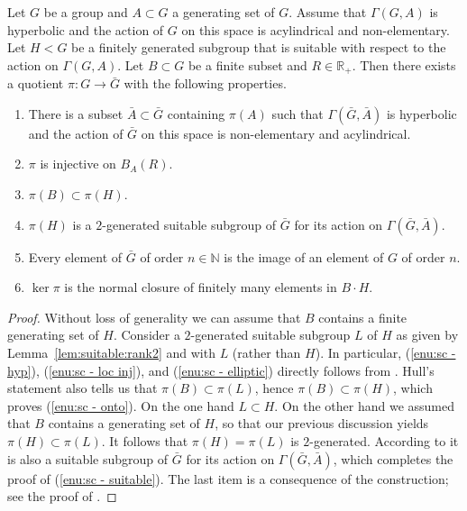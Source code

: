 \begin{theorem}
\label{thm:sc}
Let $G$ be a group and $A \subset G$ a generating set of $G$.
Assume that $\Gamma(G,A)$ is hyperbolic and the action of $G$ on this space is acylindrical and non-elementary.
Let $H < G$ be a finitely generated subgroup that is suitable with respect to the action on $\Gamma(G,A)$. Let $B \subset G$ be a finite subset and $R \in \mathbb R_+$. Then there exists a quotient $\pi \colon G \to \bar G$ with the following properties.
\begin{enumerate}
\item\label{enu:sc - hyp} There is a subset $\bar A \subset \bar G$ containing $\pi(A)$ such that $\Gamma(\bar G, \bar A)$ is hyperbolic and the action of $\bar G$ on this space is non-elementary and acylindrical.
\item \label{enu:sc - loc inj} $\pi$ is injective on $B_A(R)$.
\item \label{enu:sc - onto} $\pi(B) \subset \pi(H)$.
\item \label{enu:sc - suitable} $\pi(H)$ is a $2$-generated suitable subgroup of $\bar G$ for its action on $\Gamma(\bar G, \bar A)$.
\item \label{enu:sc - elliptic} Every element of $\bar G$ of order $n \in \mathbb{N}$ is the image of an element of $G$ of order $n$.
\item \label{enu:sc - fp} $\ker\pi$ is the normal closure of finitely many elements in $B \cdot H$.
\end{enumerate}
\end{theorem}

\begin{proof}
Without loss of generality we can assume that $B$ contains a finite generating set of $H$.
Consider a $2$-generated suitable subgroup $L$ of $H$ as given by Lemma~\ref{lem:suitable:rank2} and \cite[Th.\,7.1]{hull} with $L$ (rather than $H$).
In particular, (\ref{enu:sc - hyp}), (\ref{enu:sc - loc inj}), and (\ref{enu:sc - elliptic}) directly follows from \cite[Th.\,7.1]{hull}.
Hull's statement also tells us that $\pi(B) \subset \pi(L)$, hence $\pi(B) \subset \pi(H)$, which proves (\ref{enu:sc - onto}).
On the one hand $L \subset H$.
On the other hand we assumed that $B$ contains a generating set of $H$, so that our previous discussion yields $\pi(H) \subset \pi(L)$.
It follows that $\pi(H) = \pi(L)$ is $2$-generated.
According to \cite[Th.\,7.1]{hull} it is also a suitable subgroup of $\bar G$ for its action on $\Gamma(\bar G, \bar A)$, which completes the proof of (\ref{enu:sc - suitable}).
The last item is a consequence of the construction; see the proof of \cite[Th.\,7.1]{hull}.
\end{proof}


